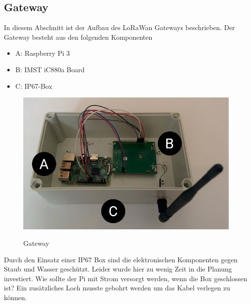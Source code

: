 \documentclass[11pt,english,german]{report}
\theoremstyle{definition}
\begin{document}
\subsection{Gateway}
In diesem Abschnitt ist der Aufbau des LoRaWan Gateways beschrieben. Der Gateway besteht aus den folgenden Komponenten
\begin{itemize}
	\item A: Raspberry Pi 3
	\item B: IMST iC880a Board \cite{ic880}
	\item C: IP67-Box
\end{itemize}
\begin{figure}[h]
	\centering
	\includegraphics[width=\textwidth]{img/gateway/gateway.png}\\[0.3cm]
	\caption[Gateway]
	{Gateway}
\end{figure}
Durch den Einsatz einer IP67 Box sind die elektronischen Komponenten gegen Staub und Wasser geschützt. Leider wurde hier zu wenig Zeit in die Planung investiert. Wie sollte der Pi mit Strom versorgt werden, wenn die Box geschlossen ist? Ein zusätzliches Loch musste gebohrt werden um das Kabel verlegen zu können. 


\newpage
\end{document}
